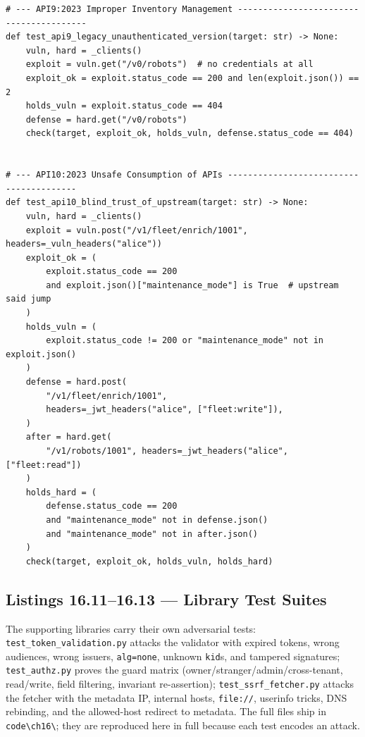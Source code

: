 \begin{verbatim}
# --- API9:2023 Improper Inventory Management ----------------------------------------
def test_api9_legacy_unauthenticated_version(target: str) -> None:
    vuln, hard = _clients()
    exploit = vuln.get("/v0/robots")  # no credentials at all
    exploit_ok = exploit.status_code == 200 and len(exploit.json()) == 2
    holds_vuln = exploit.status_code == 404
    defense = hard.get("/v0/robots")
    check(target, exploit_ok, holds_vuln, defense.status_code == 404)


# --- API10:2023 Unsafe Consumption of APIs ----------------------------------------
def test_api10_blind_trust_of_upstream(target: str) -> None:
    vuln, hard = _clients()
    exploit = vuln.post("/v1/fleet/enrich/1001", headers=_vuln_headers("alice"))
    exploit_ok = (
        exploit.status_code == 200
        and exploit.json()["maintenance_mode"] is True  # upstream said jump
    )
    holds_vuln = (
        exploit.status_code != 200 or "maintenance_mode" not in exploit.json()
    )
    defense = hard.post(
        "/v1/fleet/enrich/1001",
        headers=_jwt_headers("alice", ["fleet:write"]),
    )
    after = hard.get(
        "/v1/robots/1001", headers=_jwt_headers("alice", ["fleet:read"])
    )
    holds_hard = (
        defense.status_code == 200
        and "maintenance_mode" not in defense.json()
        and "maintenance_mode" not in after.json()
    )
    check(target, exploit_ok, holds_vuln, holds_hard)
\end{verbatim}

\subsection{Listings 16.11--16.13 --- Library Test Suites}
\label{lst:ch16-libtests}

The supporting libraries carry their own adversarial tests:
\texttt{test\_token\_validation.py} attacks the validator with expired
tokens, wrong audiences, wrong issuers, \texttt{alg=none}, unknown
\texttt{kid}s, and tampered signatures; \texttt{test\_authz.py} proves the
guard matrix (owner/stranger/admin/cross-tenant, read/write, field
filtering, invariant re-assertion); \texttt{test\_ssrf\_fetcher.py} attacks
the fetcher with the metadata IP, internal hosts, \texttt{file://},
userinfo tricks, DNS rebinding, and the allowed-host redirect to metadata.
The full files ship in \texttt{code\textbackslash{}ch16\textbackslash{}};
they are reproduced here in full because each test encodes an attack.

